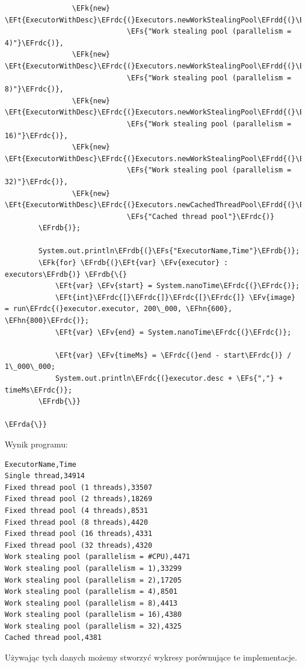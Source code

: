 \documentclass[11pt]{article}
\newcommand{\EFs}[1]{\textcolor{EFs}{#1}} %
\newcommand{\EFk}[1]{\textcolor{EFk}{#1}} %
\newcommand{\EFv}[1]{\textcolor{EFv}{#1}} %
\newcommand{\EFt}[1]{\textcolor{EFt}{#1}} %
\newcommand{\EFhn}[1]{\textcolor{EFhn}{#1}} %
\newcommand{\EFrda}[1]{#1} %
\newcommand{\EFrdb}[1]{\textcolor{EFrdb}{#1}} %
\newcommand{\EFrdc}[1]{\textcolor{EFrdc}{#1}} %
\newcommand{\EFrdd}[1]{\textcolor{EFrdd}{#1}} %
\begin{document}
\begin{Code}
\begin{Verbatim}
                \EFk{new} \EFt{ExecutorWithDesc}\EFrdc{(}Executors.newWorkStealingPool\EFrdd{(}\EFhn{4}\EFrdd{)},
                             \EFs{"Work stealing pool (parallelism = 4)"}\EFrdc{)},
                \EFk{new} \EFt{ExecutorWithDesc}\EFrdc{(}Executors.newWorkStealingPool\EFrdd{(}\EFhn{8}\EFrdd{)},
                             \EFs{"Work stealing pool (parallelism = 8)"}\EFrdc{)},
                \EFk{new} \EFt{ExecutorWithDesc}\EFrdc{(}Executors.newWorkStealingPool\EFrdd{(}\EFhn{16}\EFrdd{)},
                             \EFs{"Work stealing pool (parallelism = 16)"}\EFrdc{)},
                \EFk{new} \EFt{ExecutorWithDesc}\EFrdc{(}Executors.newWorkStealingPool\EFrdd{(}\EFhn{32}\EFrdd{)},
                             \EFs{"Work stealing pool (parallelism = 32)"}\EFrdc{)},
                \EFk{new} \EFt{ExecutorWithDesc}\EFrdc{(}Executors.newCachedThreadPool\EFrdd{(}\EFrdd{)},
                             \EFs{"Cached thread pool"}\EFrdc{)}
        \EFrdb{)};

        System.out.println\EFrdb{(}\EFs{"ExecutorName,Time"}\EFrdb{)};
        \EFk{for} \EFrdb{(}\EFt{var} \EFv{executor} : executors\EFrdb{)} \EFrdb{\{}
            \EFt{var} \EFv{start} = System.nanoTime\EFrdc{(}\EFrdc{)};
            \EFt{int}\EFrdc{[}\EFrdc{]}\EFrdc{[}\EFrdc{]} \EFv{image} = run\EFrdc{(}executor.executor, 200\_000, \EFhn{600}, \EFhn{800}\EFrdc{)};
            \EFt{var} \EFv{end} = System.nanoTime\EFrdc{(}\EFrdc{)};

            \EFt{var} \EFv{timeMs} = \EFrdc{(}end - start\EFrdc{)} / 1\_000\_000;
            System.out.println\EFrdc{(}executor.desc + \EFs{","} + timeMs\EFrdc{)};
        \EFrdb{\}}

\EFrda{\}}
\end{Verbatim}
\end{Code}

Wynik programu:
\begin{tcolorbox}
\begin{Verbatim}
ExecutorName,Time
Single thread,34914
Fixed thread pool (1 threads),33507
Fixed thread pool (2 threads),18269
Fixed thread pool (4 threads),8531
Fixed thread pool (8 threads),4420
Fixed thread pool (16 threads),4331
Fixed thread pool (32 threads),4320
Work stealing pool (parallelism = #CPU),4471
Work stealing pool (parallelism = 1),33299
Work stealing pool (parallelism = 2),17205
Work stealing pool (parallelism = 4),8501
Work stealing pool (parallelism = 8),4413
Work stealing pool (parallelism = 16),4380
Work stealing pool (parallelism = 32),4325
Cached thread pool,4381
\end{Verbatim}


\end{tcolorbox}Używając tych danych możemy stworzyć wykresy porównujące te implementacje.
\newpage
\end{document}
